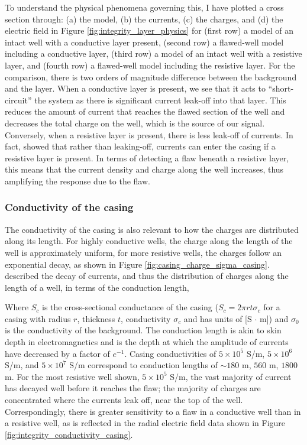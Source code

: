 To understand the physical phenomena governing this, I have plotted a cross section through: (a) the model, (b) the currents, (c) the charges, and (d) the electric field in Figure \ref{fig:integrity_layer_physics} for (first row) a model of an intact well with a conductive layer present, (second row) a flawed-well model including a conductive layer, (third row) a model of an intact well with a resistive layer, and (fourth row) a flawed-well model including the resistive layer. For the comparison, there is two orders of magnitude difference between the background and the layer. When a conductive layer is present, we see that it acts to ``short-circuit'' the system as there is significant current leak-off into that layer. This reduces the amount of current that reaches the flawed section of the well and decreases the total charge on the well, which is the source of our signal. Conversely, when a resistive layer is present, there is less leak-off of currents. In fact, \cite{Yang2016} showed that rather than leaking-off, currents can enter the casing if a resistive layer is present. In terms of detecting a flaw beneath a resistive layer, this means that the current density and charge along the well increases, thus amplifying the response due to the flaw.



\subsubsection{Conductivity of the casing}
The conductivity of the casing is also relevant to how the charges are distributed along its length. For highly conductive wells, the charge along the length of the well is approximately uniform, for more resistive wells, the charges follow an exponential decay, as shown in Figure \ref{fig:casing_charge_sigma_casing}. \cite{Schenkel1991} described the decay of currents, and thus the distribution of charges along the length of a well, in terms of the conduction length,

Where $S_c$ is the cross-sectional conductance of the casing ($S_c = 2\pi r t \sigma_c$ for a casing with radius $r$, thickness $t$, conductivity $\sigma_c$ and has units of [S $\cdot$ m]) and $\sigma_0$ is the conductivity of the background. The conduction length is akin to skin depth in electromagnetics and is the depth at which  the amplitude of currents have decreased by a factor of $e^{-1}$. Casing conductivities of $5 \times 10^5$ S/m, $5 \times 10^6$ S/m, and $5 \times 10^7$ S/m correspond to conduction lengths of $\sim 180$ m, $560$ m, $1800$ m. For the most resistive well shown, $5 \times 10^{5}$ S/m, the vast majority of current has decayed well before it reaches the flaw; the majority of charges are concentrated where the currents leak off, near the top of the well. Correspondingly, there is greater sensitivity to a flaw in a conductive well than in a resistive well, as is reflected in the radial electric field data shown in Figure \ref{fig:integrity_conductivity_casing}.


